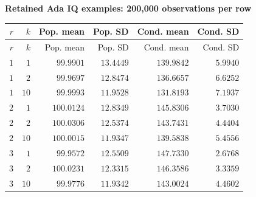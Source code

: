 
\begingroup\small
\setlength{\tabcolsep}{4pt}
\noindent\textbf{Retained Ada IQ examples: 200,000 observations per row}
\begin{longtable}{rrrrrr}
\toprule
$r$ & $k$ & Pop. mean & Pop. SD & Cond. mean & Cond. SD \\
\midrule
\endfirsthead
$r$ & $k$ & Pop. mean & Pop. SD & Cond. mean & Cond. SD \\
\midrule
\endhead
\bottomrule
\endfoot
$1$ & $1$ & $99.9901$ & $13.4449$ & $139.9842$ & $5.9940$ \\
$1$ & $2$ & $99.9697$ & $12.8474$ & $136.6657$ & $6.6252$ \\
$1$ & $10$ & $99.9993$ & $11.9528$ & $131.8193$ & $7.1937$ \\
$2$ & $1$ & $100.0124$ & $12.8349$ & $145.8306$ & $3.7030$ \\
$2$ & $2$ & $100.0306$ & $12.5374$ & $143.7431$ & $4.4404$ \\
$2$ & $10$ & $100.0015$ & $11.9347$ & $139.5838$ & $5.4556$ \\
$3$ & $1$ & $99.9572$ & $12.5509$ & $147.7330$ & $2.6768$ \\
$3$ & $2$ & $100.0231$ & $12.3315$ & $146.3586$ & $3.3359$ \\
$3$ & $10$ & $99.9776$ & $11.9342$ & $143.0024$ & $4.4602$ \\
\end{longtable}
\endgroup
